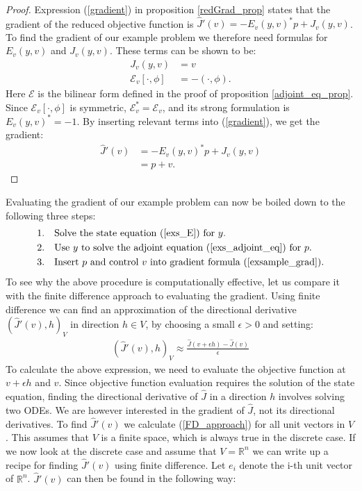 \begin{proof}
Expression (\ref{gradient}) in proposition \ref{redGrad_prop} states that the gradient of the reduced objective function is $\hat J'(v) = -E_v(y,v)^*p + J_v(y,v)$. To find the gradient of our example problem we therefore need formulas for $E_v(y,v)$ and $J_v(y,v)$. These terms can be shown to be:
\begin{align*}
J_v(y,v) &= v \\
\mathcal{E}_v[\cdot,\phi] &= -(\cdot,\phi).
\end{align*}
Here $\mathcal{E}$ is the bilinear form defined in the proof of proposition \ref{adjoint_eq_prop}. Since $\mathcal{E}_v[\cdot,\phi]$ is symmetric, $\mathcal{E}_v^*=\mathcal{E}_v$, and its strong formulation is $E_v(y,v)^*=-1$. By inserting relevant terms into (\ref{gradient}), we get the gradient:
\begin{align}
\hat{J}'(v)&=-E_v(y,v)^*p + J_v(y,v) \\
&= p+v. \label{exs_grad}
\end{align} 
\end{proof}
\noindent
Evaluating the gradient of our example problem can now be boiled down to the following three steps:
\begin{align*}
1.\quad & \textrm{Solve the state equation (\ref{exs_E}) for $y$. }\\
2.\quad & \textrm{Use $y$ to solve the adjoint equation (\ref{exs_adjoint_eq}) for $p$. }\\
3.\quad & \textrm{Insert $p$ and control $v$ into gradient formula (\ref{exsample_grad}).}
\end{align*}
To see why the above procedure is computationally effective, let us compare it with the finite difference approach to evaluating the gradient. Using finite difference we can find an approximation of the directional derivative $(\hat J'(v),h)_V$ in direction $h\in V$, by choosing a small $\epsilon>0$ and setting:
\begin{align}
(\hat J'(v), h)_V\approx\frac{\hat J(v+\epsilon h)-\hat J(v)}{\epsilon} \label{FD_approach}
\end{align} 
To calculate the above expression, we need to evaluate the objective function at $v+\epsilon h$ and $v$. Since objective function evaluation requires the solution of the state equation, finding the directional derivative of $\hat J$ in a direction $h$ involves solving two ODEs. We are however interested in the gradient of $\hat J$, not its directional derivatives. To find $\hat J'(v)$ we calculate (\ref{FD_approach}) for all unit vectors in $V$. This assumes that $V$ is a finite space, which is always true in the discrete case. If we now look at the discrete case and assume that $V=\mathbb{R}^n$ we can write up a recipe for finding $\hat J'(v)$ using finite difference. Let $e_i$ denote the i-th unit vector of $\mathbb{R}^n$. $\hat J'(v)$ can then be found in the following way:
